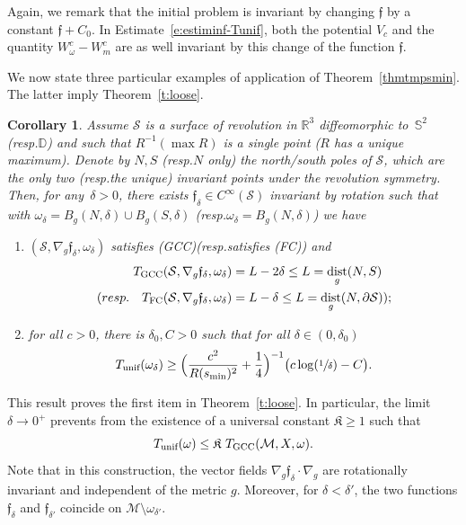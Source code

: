\documentclass[10pt]{amsart}
\newcommand{\FC}{\textup{FC}}
\newcommand{\pFC}{\textup{(FC)}\xspace}
\newcommand{\GCC}{\textup{GCC}}
\newcommand{\pGCC}{\textup{(GCC)}\xspace}
\newcommand{\unif}{\textup{unif}}
\newtheorem{corollary}[lemma]{Corollary}
\theoremstyle{definition}
\newcommand{\M}{\ensuremath{\mathcal M}}
\newcommand{\calS}{\ensuremath{\mathcal S}}
\newcommand{\mb}[1]{\ensuremath{\mathbb{#1}}}
\newcommand{\ID}{\ensuremath{\mathbb D}}
\newcommand{\R}{{\mb{R}}}
\newcommand{\bS}{\ensuremath{\mathbb S}}
\newcommand{\f}{\ensuremath{\mathfrak{f}}}
\DeclareMathOperator{\dist}{dist}
\newcommand{\ce}{c}
\let\d\partial
\let\de\delta
\providecommand{\resp}{resp.}\providecommand{\cf}{cf.}
\begin{document}
Again, we remark that the initial problem is invariant by changing $\f$ by a constant $\f+C_0$. In Estimate~\eqref{e:estiminf-Tunif}, both the potential $V_{c}$ and the quantity $W_{\omega}^{\ce}-W_{m}^{\ce}$ are as well invariant by this change of the function $\f$.

We now state three particular examples of application of Theorem~\ref{thmtmpsmin}.
The latter imply Theorem~\ref{t:loose}.

\begin{corollary}
\label{c:sphere-disk}
Assume $\calS$ is a surface of revolution in $\R^3$ diffeomorphic to~$\bS^2$ (\resp $\ID$) and such that $R^{-1}(\max R)$ is a single point ($R$ has a unique maximum). Denote by $N,S$ (\resp $N$ only) the north/south poles of $\calS$, which are the only two (\resp the unique) invariant points under the revolution symmetry.
Then, for any~\hbox{$\delta>0$}, there exists $\f_\delta \in C^\infty(\calS)$ invariant by rotation such that
with $\omega_\delta = B_g(N, \delta) \cup B_g(S, \delta)$ (\resp $\omega_\delta = B_g(N, \delta)$) we have
\begin{enumerate}
\item $(\calS,\nabla_g\f_\de,\omega_\delta)$ satisfies \pGCC (\resp satisfies \pFC) and\vspace*{-3pt}
\begin{align*}
T_{\GCC}(\calS,\nabla_g\f_\de,\omega_\delta) &= L-2\delta \leq L= \dist_g(N,S)\\
(\resp \quad T_{\FC}(\calS,\nabla_g\f_\de,\omega_\delta) &= L-\delta \leq L= \dist_g(N,\d\calS));
\end{align*}
\item for all $\ce>0$, there is $\delta_0,C >0$ such that for all $\delta \in (0,\delta_0)$\vspace*{-3pt}
\[
T_{\unif}(\omega_\delta) \geq \Bigl( \frac{\ce^2}{R(s_{\min})^2} + \frac14 \Bigr)^{-1} \bigl( \ce \log(\sfrac1{\delta}) - C \bigr).
\]
\end{enumerate}
\end{corollary}
This result proves the first item in Theorem~\ref{t:loose}.
In particular, the limit \hbox{$\delta\to 0^+$} prevents from the existence of a universal constant $\mathfrak{K}\geq 1$ such that\vspace*{-3pt}
\[
T_{\unif}(\omega) \leq \mathfrak{K} \ T_{\GCC}(\M,X,\omega).
\]
Note that in this construction, the vector fields $\nabla_g\f_\de \cdot \nabla_g$ are rotationally invariant and independent of the metric $g$. Moreover, for $\delta < \delta'$, the two functions $\f_\de$ and $\f_{\de'}$ coincide on $\M\setminus \omega_{\delta'}$.
\end{document}
